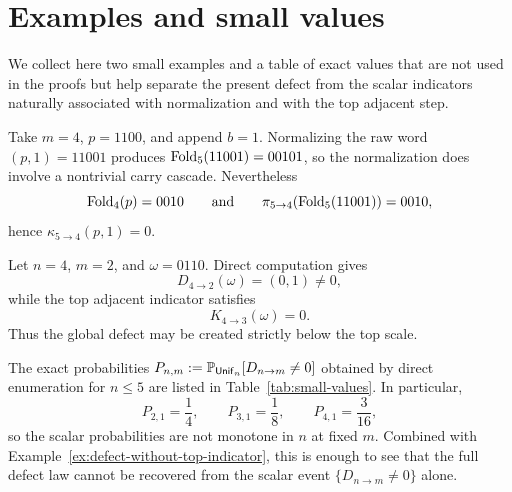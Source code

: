 \appendix

\section{Examples and small values}
\label{app:supplementary}

We collect here two small examples and a table of exact values that are not
used in the proofs but help separate the present defect from the scalar
indicators naturally associated with normalization and with the top adjacent
step.

\begin{example}
\label{ex:cascade-without-defect}
Take $m=4$, $p=1100$, and append $b=1$.  Normalizing the raw word
$(p,1)=11001$ produces $\operatorname{Fold}_5(11001)=00101$, so the normalization does
involve a nontrivial carry cascade.  Nevertheless
\[
\operatorname{Fold}_4(p)=0010
\qquad\text{and}\qquad
\pi_{5\to 4}(\operatorname{Fold}_5(11001))=0010,
\]
hence $\kappa_{5\to 4}(p,1)=0$.
\end{example}

\begin{example}
\label{ex:defect-without-top-indicator}
Let $n=4$, $m=2$, and $\omega=0110$.  Direct computation gives
\[
D_{4\to 2}(\omega)=(0,1)\ne 0,
\]
while the top adjacent indicator satisfies
\[
K_{4\to 3}(\omega)=0.
\]
Thus the global defect may be created strictly below the top scale.
\end{example}

\begin{remark}
\label{rem:small-values}
The exact probabilities $P_{n,m}:=\mathbb{P}_{\mathsf{Unif}_n}[D_{n\to m}\ne 0]$ obtained by
direct enumeration for $n\le 5$ are listed in Table~\ref{tab:small-values}.
In particular,
\[
P_{2,1}=\frac14,
\qquad
P_{3,1}=\frac18,
\qquad
P_{4,1}=\frac{3}{16},
\]
so the scalar probabilities are not monotone in $n$ at fixed $m$.  Combined
with Example~\ref{ex:defect-without-top-indicator}, this is enough to see that
the full defect law cannot be recovered from the scalar event
$\{D_{n\to m}\ne 0\}$ alone.
\end{remark}

